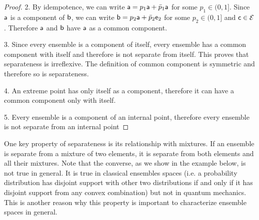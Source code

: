 \begin{mathSection}
\begin{proof}
	2. By idempotence, we can write $\ens[a] = p_1 \ens[a] + \bar{p}_1 \ens[a]$ for some $p_1 \in (0,1]$. Since $\ens[a]$ is a component of $\ens[b]$, we can write $\ens[b] = p_2 \ens[a] + \bar{p}_2 \ens[e]_2$ for some $p_2 \in (0, 1]$ and $\ens[c] \in \Ens$. Therefore $\ens[a]$ and $\ens[b]$ have $\ens[a]$ as a common component.
	
	3. Since every ensemble is a component of itself, every ensemble has a common component with itself and therefore is not separate from itself. This proves that separateness is irreflexive. The definition of common component is symmetric and therefore so is separateness.
	
	4. An extreme point has only itself as a component, therefore it can have a common component only with itself.
	
	5. Every ensemble is a component of an internal point, therefore every ensemble is not separate from an internal point
\end{proof}
\end{mathSection}

One key property of separateness is its relationship with mixtures. If an ensemble is separate from a mixture of two elements, it is separate from both elements and all their mixtures. Note that the converse, as we show in the example below, is not true in general. It is true in classical ensembles spaces (i.e. a probability distribution has disjoint support with other two distributions if and only if it has disjoint support from any convex combination) but not in quantum mechanics. This is another reason why this property is important to characterize ensemble spaces in general.

